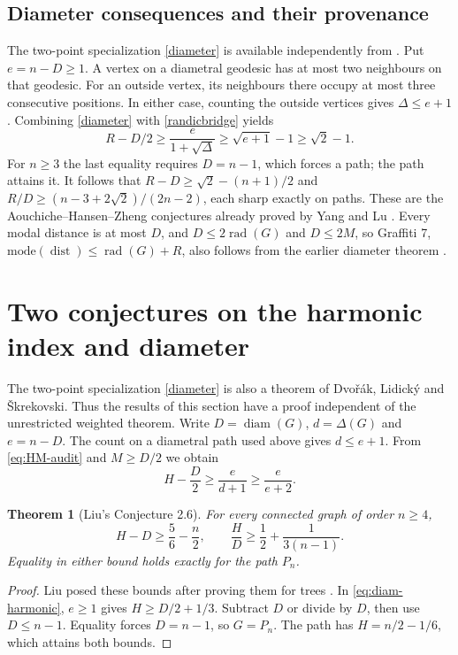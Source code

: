 \documentclass[11pt,a4paper]{article}
\newtheorem{theorem}{Theorem}[section]
\theoremstyle{remark}\newtheorem*{remark}{Remark}
\newcommand{\rad}{\operatorname{rad}}
\DeclareMathOperator{\dist}{dist}
\begin{document}
\subsection{Diameter consequences and their provenance}
The two-point specialization \eqref{diameter} is available independently from \cite{dls}. Put $e=n-D\ge1$. A vertex on a diametral geodesic has at most two neighbours on that geodesic. For an outside vertex, its neighbours there occupy at most three consecutive positions. In either case, counting the outside vertices gives $\Delta\le e+1$. Combining \eqref{diameter} with \eqref{randicbridge} yields
\[
 R-D/2\ge \frac{e}{1+\sqrt\Delta}\ge\sqrt{e+1}-1\ge\sqrt2-1.
\]
For $n\ge3$ the last equality requires $D=n-1$, which forces a path; the path attains it. It follows that $R-D\ge\sqrt2-(n+1)/2$ and $R/D\ge (n-3+2\sqrt2)/(2n-2)$, each sharp exactly on paths. These are the Aouchiche--Hansen--Zheng conjectures already proved by Yang and Lu \cite{ylu}. Every modal distance is at most $D$, and $D\le2\rad(G)$ and $D\le2M$, so Graffiti 7, $\mathrm{mode}(\dist)\le\rad(G)+R$, also follows from the earlier diameter theorem \cite{wow,dls}.


\section{Two conjectures on the harmonic index and diameter}\label{sec:harm-diameter}

The two-point specialization \eqref{diameter} is also a theorem of Dvo\v{r}\'ak, Lidick\'y and \v{S}krekovski. Thus the results of this section have a proof independent of the unrestricted weighted theorem. Write $D=\operatorname{diam}(G)$, $d=\Delta(G)$ and $e=n-D$. The count on a diametral path used above gives $d\le e+1$. From \eqref{eq:HM-audit} and $M\ge D/2$ we obtain
\begin{equation}\label{eq:diam-harmonic}
 H-\frac D2\ge\frac{e}{d+1}\ge\frac{e}{e+2}.
\end{equation}

\begin{theorem}[Liu's Conjecture 2.6]\label{thm:liu-harm}
For every connected graph of order $n\ge4$,
\[
 H-D\ge\frac56-\frac n2,\qquad \frac HD\ge\frac12+\frac{1}{3(n-1)}.
\]
Equality in either bound holds exactly for the path $P_n$.
\end{theorem}
\begin{proof}
Liu posed these bounds after proving them for trees \cite{liu2013}. In \eqref{eq:diam-harmonic}, $e\ge1$ gives $H\ge D/2+1/3$. Subtract $D$ or divide by $D$, then use $D\le n-1$. Equality forces $D=n-1$, so $G=P_n$. The path has $H=n/2-1/6$, which attains both bounds.
\end{proof}
\end{document}
